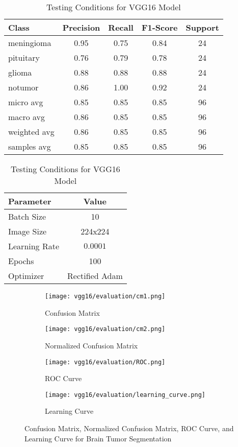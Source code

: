 \begin{table}[H]
\parbox{.45\linewidth}{
\centering
\caption{Performance Metrics for VGG16 Model}\label{tab:vgg16_metrics}
\begin{tabular}{|l|c|c|c|c|}
\hline
\textbf{Class} & \textbf{Precision} & \textbf{Recall} & \textbf{F1-Score} & \textbf{Support} \\
\hline
meningioma & 0.95 & 0.75 & 0.84 & 24 \\
\hline
pituitary & 0.76 & 0.79 & 0.78 & 24 \\
\hline
glioma & 0.88 & 0.88 & 0.88 & 24 \\
\hline
notumor & 0.86 & 1.00 & 0.92 & 24 \\
\hline
micro avg & 0.85 & 0.85 & 0.85 & 96 \\
\hline
macro avg & 0.86 & 0.85 & 0.85 & 96 \\
\hline
weighted avg & 0.86 & 0.85 & 0.85 & 96 \\
\hline
samples avg & 0.85 & 0.85 & 0.85 & 96 \\
\hline
\end{tabular}
}
\hfill
\parbox{.45\linewidth}{
\centering
\caption{Testing Conditions for VGG16 Model}\label{tab:vgg16_conditions}
\begin{tabular}{|l|c|}
\hline
\textbf{Parameter} & \textbf{Value} \\
\hline
Batch Size & 10 \\
\hline
Image Size & 224x224 \\
\hline
Learning Rate & $0.0001$ \\
\hline
Epochs & 100 \\
\hline
Optimizer & Rectified Adam \\
\hline
\end{tabular}
}
\end{table}

\begin{figure}[H]
  \centering
  \begin{subfigure}[b]{0.2\textwidth}
    \centering
    \texttt{[image: vgg16/evaluation/cm1.png]}
    \caption{Confusion Matrix}
    \label{fig:vgg16_cm1}
  \end{subfigure}
  \hfill
  \begin{subfigure}[b]{0.2\textwidth}
    \centering
    \texttt{[image: vgg16/evaluation/cm2.png]}
    \caption{Normalized Confusion Matrix}
    \label{fig:vgg16_cm2}
  \end{subfigure}
  \hfill
  \begin{subfigure}[b]{0.25\textwidth}
    \centering
    \texttt{[image: vgg16/evaluation/ROC.png]}
    \caption{ROC Curve}
    \label{fig:vgg16_roc}
  \end{subfigure}
  \hfill
  \begin{subfigure}[b]{0.25\textwidth}
    \centering
    \texttt{[image: vgg16/evaluation/learning\_curve.png]}
    \caption{Learning Curve}
    \label{fig:vgg16_learning_curve}
  \end{subfigure}
  \caption{Confusion Matrix, Normalized Confusion Matrix, ROC Curve, and Learning Curve for Brain Tumor Segmentation}
  \label{fig:vgg16_evaluation}
\end{figure}

